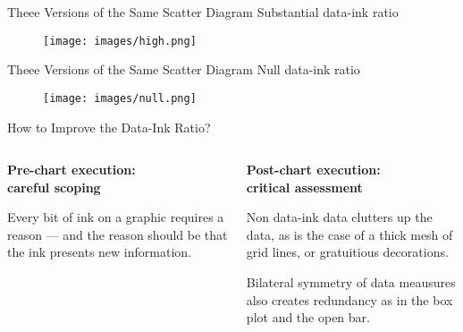 \documentclass[aspectratio=1610]{beamer}
\begin{document}
\begin{frame}{Theee Versions of the Same Scatter Diagram}
	{Substantial data-ink ratio}
	\begin{figure}
		\begin{center}
			\texttt{[image: images/high.png]}
		\end{center}
	\end{figure}
\end{frame}

\begin{frame}{Theee Versions of the Same Scatter Diagram}
	{Null data-ink ratio}
	\begin{figure}
		\begin{center}
			\texttt{[image: images/null.png]}
		\end{center}
	\end{figure}
\end{frame}

\begin{frame}{How to Improve the Data-Ink Ratio?}
	\begin{columns}[t]
		\begin{column}{0.5\textwidth}
			\begin{center}
				\textbf{Pre-chart execution:\\careful scoping}
			\end{center}
			\small
			\pause
			\begin{tcolorbox}[
					colback=blue!5!white,
					colframe=blue!60!black,
					title={
							\centering
							!! Maximize the data-ink ratio !!
						}]
				\raggedright Every bit of ink on a graphic requires a reason
				--- and the reason should be that the ink presents
				new information.
			\end{tcolorbox}

		\end{column}
		\pause
		\begin{column}{0.5\textwidth}
			\begin{center}
				\textbf{Post-chart execution:\\critical assessment}
			\end{center}
			\pause
			\small
			\begin{tcolorbox}[
					colback=blue!5!white,
					colframe=blue!60!green,
					title={
							\centering
							!! Erase the non data-ink !!
						}]
				\raggedright Non data-ink data clutters up the data, as is the case
				of a thick mesh of grid lines, or gratuitious
				decorations.
			\end{tcolorbox}

			\pause

			\begin{tcolorbox}[
					colback=blue!5!white,
					colframe=blue!60!green,
					title={
							\centering
							!! Erase redundant data-ink !!
						}]
				\raggedright Bilateral symmetry of data meausures also creates
				redundancy as in the box plot and the open bar.
			\end{tcolorbox}

		\end{column}
	\end{columns}
\end{frame}
\end{document}
